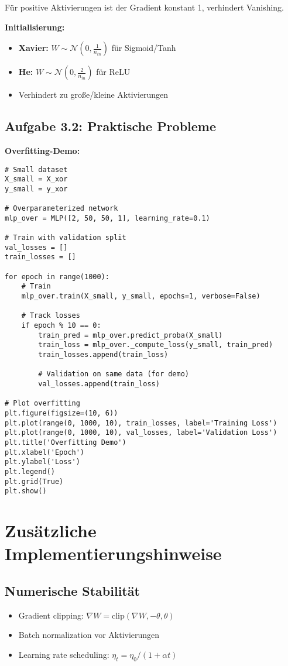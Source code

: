 ﻿\documentclass[12pt,a4paper]{article}
\begin{document}
Für positive Aktivierungen ist der Gradient konstant 1, verhindert Vanishing.

\textbf{Initialisierung:}
\begin{itemize}
    \item \textbf{Xavier:} $W \sim \mathcal{N}(0, \frac{1}{n_{in}})$ für Sigmoid/Tanh
    \item \textbf{He:} $W \sim \mathcal{N}(0, \frac{2}{n_{in}})$ für ReLU
    \item Verhindert zu große/kleine Aktivierungen
\end{itemize}

\subsection{Aufgabe 3.2: Praktische Probleme}

\textbf{Overfitting-Demo:}

\begin{lstlisting}
# Small dataset
X_small = X_xor
y_small = y_xor

# Overparameterized network
mlp_over = MLP([2, 50, 50, 1], learning_rate=0.1)

# Train with validation split
val_losses = []
train_losses = []

for epoch in range(1000):
    # Train
    mlp_over.train(X_small, y_small, epochs=1, verbose=False)
    
    # Track losses
    if epoch % 10 == 0:
        train_pred = mlp_over.predict_proba(X_small)
        train_loss = mlp_over._compute_loss(y_small, train_pred)
        train_losses.append(train_loss)
        
        # Validation on same data (for demo)
        val_losses.append(train_loss)

# Plot overfitting
plt.figure(figsize=(10, 6))
plt.plot(range(0, 1000, 10), train_losses, label='Training Loss')
plt.plot(range(0, 1000, 10), val_losses, label='Validation Loss')
plt.title('Overfitting Demo')
plt.xlabel('Epoch')
plt.ylabel('Loss')
plt.legend()
plt.grid(True)
plt.show()
\end{lstlisting}

\section*{Zusätzliche Implementierungshinweise}

\subsection*{Numerische Stabilität}
\begin{itemize}
    \item Gradient clipping: $\nabla W = \text{clip}(\nabla W, -\theta, \theta)$
    \item Batch normalization vor Aktivierungen
    \item Learning rate scheduling: $\eta_t = \eta_0 / (1 + \alpha t)$
\end{itemize}
\end{document}
